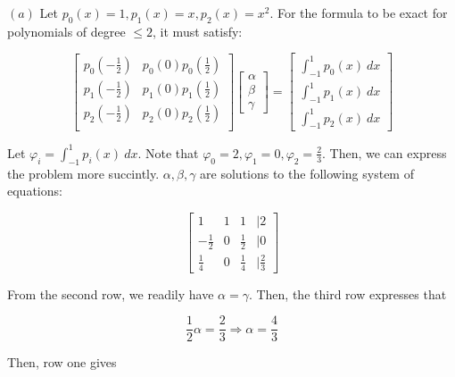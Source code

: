 \documentclass[12pt]{article}
\theoremstyle{definition}
\begin{document}
$(a)$ Let $p_0(x) = 1, p_1(x) = x, p_2(x) = x^2$. For the formula to be exact
for polynomials of degree $\leq 2$, it must satisfy: 

\begin{equation*}
    \begin{bmatrix} 
             
    p_0\left( -\frac{1}{2} \right) & p_0\left( 0 \right) p_0\left( \frac{1}{2}
    \right)  \\ 
    p_1\left( -\frac{1}{2} \right) & p_1\left( 0 \right) p_1\left( \frac{1}{2}
    \right)  \\ 
    p_2\left( -\frac{1}{2} \right) & p_2\left( 0 \right) p_2\left( \frac{1}{2}
    \right)  \\ 
    \end{bmatrix} \begin{bmatrix} 
            \alpha \\ \beta \\ \gamma 
    \end{bmatrix} = \begin{bmatrix} 
    \int_{-1}^1 p_0(x) ~ dx \\ 
    \int_{-1}^1 p_1(x) ~ dx \\ 
    \int_{-1}^1 p_2(x) ~ dx
    \end{bmatrix} 
\end{equation*}

Let $\varphi_i = \int_{-1}^1 p_i(x) ~ dx$. Note that $\varphi_0 = 2, \varphi_1 =
0, \varphi_2 = \frac{2}{3}$. Then, we can express the problem more succintly.
$\alpha, \beta, \gamma$ are solutions to the following system of equations: 

\begin{equation*}
    \begin{bmatrix} 
        1 & 1 & 1 &\mid 2 \\ 
        -\frac{1}{2} & 0 & \frac{1}{2} & \mid 0\\ 
        \frac{1}{4} & 0 & \frac{1}{4} &\mid \frac{2}{3}
    \end{bmatrix} 
\end{equation*}

From the second row, we readily have $\alpha = \gamma$. Then, 
the third row expresses that 

\begin{equation*}
    \frac{1}{2}\alpha = \frac{2}{3} \Rightarrow \alpha = \frac{4}{3}
\end{equation*}

Then, row one gives 
\end{document}
